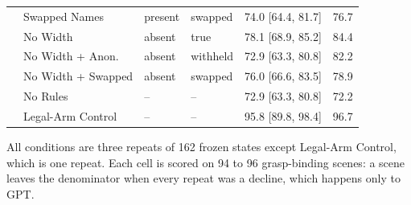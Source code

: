\begin{table}[H]
\begin{tabular}{llllrr}
     & Swapped Names & present & swapped & 74.0 [64.4, 81.7] & 76.7 \\
     & No Width & absent & true & 78.1 [68.9, 85.2] & 84.4 \\
     & No Width + Anon. & absent & withheld & 72.9 [63.3, 80.8] & 82.2 \\
     & No Width + Swapped & absent & swapped & 76.0 [66.6, 83.5] & 78.9 \\
     & No Rules & -- & -- & 72.9 [63.3, 80.8] & 72.2 \\
     & Legal-Arm Control & -- & -- & 95.8 [89.8, 98.4] & 96.7 \\
    \bottomrule
  \end{tabular}
  \begin{minipage}{\linewidth}\vspace{2pt}\footnotesize All conditions are three repeats of 162 frozen states except Legal-Arm Control, which is one repeat. Each cell is scored on 94 to 96 grasp-binding scenes: a scene leaves the denominator when every repeat was a decline, which happens only to GPT.\end{minipage}
\end{table}
